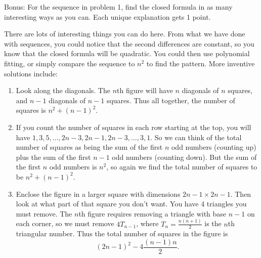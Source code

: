 \documentclass[10pt]{exam}
\begin{document}
\begin{questions}

\bonusquestion[4] Bonus: For the sequence in problem 1, find the closed formula in as many interesting ways as you can.  Each unique explanation gets 1 point.

\begin{solution}
  There are lots of interesting things you can do here.  From what we have done with sequences, you could notice that the second differences are constant, so you know that the closed formula will be quadratic.  You could then use polynomial fitting, or simply compare the sequence to $n^2$ to find the pattern.  More inventive solutions include:
  \begin{enumerate}
    \item Look along the diagonals.  The $n$th figure will have $n$ diagonals of $n$ squares, and $n-1$ diagonals of $n-1$ squares.  Thus all together, the number of squares is $n^2 + (n-1)^2$.
    \item If you count the number of squares in each row starting at the top, you will have $1, 3, 5, \ldots, 2n-3, 2n-1, 2n-3, \ldots, 3, 1$.  So we can think of the total number of squares as being the sum of the first $n$ odd numbers (counting up) plus the sum of the first $n-1$ odd numbers (counting down).  But the sum of the first $n$ odd numbers is $n^2$, so again we find the total number of squares to be $n^2 + (n-1)^2$.
    \item Enclose the figure in a larger square with dimensions $2n-1 \times 2n-1$.  Then look at what part of that square you don't want.  You have 4 triangles you must remove.  The $n$th figure requires removing a triangle with base $n-1$ on each corner, so we must remove $4T_{n-1}$, where $T_n = \frac{n(n+1)}{2}$ is the $n$th triangular number.  Thus the total number of squares in the figure is
    \[(2n-1)^2 - 4\frac{(n-1)n}{2}.\]
  \end{enumerate}
\end{solution}


\end{questions}
\end{document}

